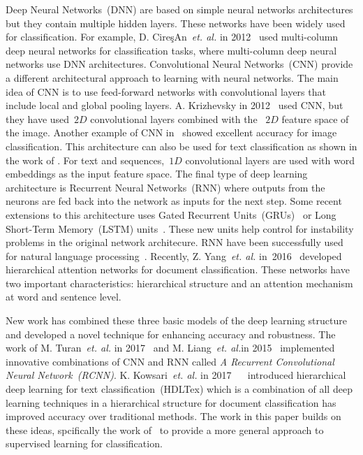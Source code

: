 \documentclass[sigconf, final]{acmart}
\begin{document}
Deep Neural Networks~(DNN) are based on simple neural networks architectures but they contain multiple hidden layers. These networks have been widely used for classification. For example, D. Cire{\c{s}}An~\textit{et. al.} in 2012~\cite{ci2012multitraffic} used multi-column deep neural networks for classification tasks, where  multi-column deep neural networks use DNN architectures. Convolutional Neural Networks~(CNN) provide a different architectural approach to learning with neural networks. The main idea of CNN is to use feed-forward networks with convolutional layers that include local and global pooling layers. A. Krizhevsky in 2012~\cite{krizhevsky2012imagenet} used CNN, but they have used~$2D$ convolutional layers combined with the ~$2D$ feature space of the image. Another example of CNN in~\cite{lecun2015deep} showed excellent accuracy for image classification.  This architecture can also be used for text classification as shown in the work of \cite{kim2014convolutional}. For text and sequences,~$1D$ convolutional layers are used with word embeddings as the input feature space. The final type of deep learning architecture is Recurrent Neural Networks~(RNN) where outputs from the neurons are fed back into the network as inputs for the next step. Some recent extensions to this architecture uses Gated Recurrent Units~(GRUs)~\cite{chung2014empirical} or Long Short-Term Memory~(LSTM) units~\cite{hochreiter1997long}. These new units help control for instability problems in the original network architecure. RNN have been successfully used for natural language processing~\cite{mikolov2010recurrent}. Recently, Z. Yang~\textit{et. al.} in~2016~\cite{yang2016hierarchical} developed hierarchical attention networks for document classification. These networks have two important characteristics: hierarchical structure and an attention mechanism at word and sentence level. 

New work has combined these three basic models of the deep learning structure and developed a novel technique for enhancing accuracy and robustness. The work of M. Turan~\textit{et. al.} in 2017~\cite{turan2017deep} and M. Liang~\textit{et. al.}in 2015~\cite{liang2015recurrent} implemented innovative combinations of CNN and RNN called \textit{A Recurrent Convolutional Neural Network~(RCNN)}. K. Kowsari~\textit{et. al.} in 2017~ ~\cite{kowsari2017HDLTex} introduced hierarchical deep learning for text classification~(HDLTex) which is a combination of all deep learning techniques in a hierarchical structure for document classification has improved accuracy over traditional methods. The work in this paper builds on these ideas, spcifically the work of~\cite{kowsari2017HDLTex} to provide a more general approach to supervised learning for classification.
\end{document}
